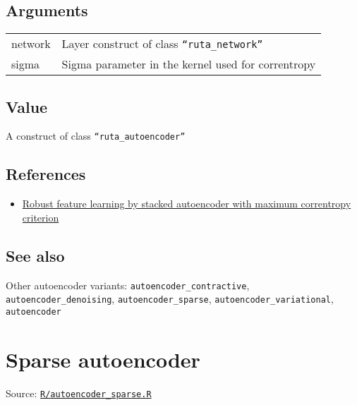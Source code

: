 \hypertarget{arguments}{\subsection{\texorpdfstring{\protect\hyperlink{arguments}{}Arguments}{Arguments}}\label{arguments}}

\begin{longtable}[c]{@{}>{\small}p{3cm}>{\raggedright}p{12.5cm}@{}}
\toprule
network & Layer construct of class
\texttt{``ruta\_network''}\tabularnewline
sigma & Sigma parameter in the kernel used for
correntropy\tabularnewline
\bottomrule
\end{longtable}

\hypertarget{value}{\subsection{\texorpdfstring{\protect\hyperlink{value}{}Value}{Value}}\label{value}}

A construct of class \texttt{``ruta\_autoencoder''}

\hypertarget{references}{\subsection{\texorpdfstring{\protect\hyperlink{references}{}References}{References}}\label{references}}

\begin{itemize}
\tightlist
\item
  \href{https://ieeexplore.ieee.org/abstract/document/6854900/}{Robust
  feature learning by stacked autoencoder with maximum correntropy
  criterion}
\end{itemize}

\hypertarget{see-also}{\subsection{\texorpdfstring{\protect\hyperlink{see-also}{}See
also}{See also}}\label{see-also}}

Other autoencoder variants: \texttt{autoencoder\_contractive},
\texttt{autoencoder\_denoising}, \texttt{autoencoder\_sparse},
\texttt{autoencoder\_variational}, \texttt{autoencoder}

\section{Sparse autoencoder}\label{sparse-autoencoder}

Source:
\href{https://github.com/fdavidcl/ruta/blob/master/R/autoencoder_sparse.R}{\texttt{R/autoencoder\_sparse.R}}

